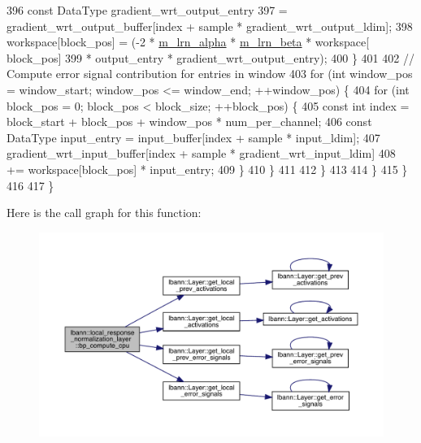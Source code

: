 \begin{DoxyCode}
396             \textcolor{keyword}{const} DataType gradient\_wrt\_output\_entry
397               = gradient\_wrt\_output\_buffer[index + sample * gradient\_wrt\_output\_ldim];
398             workspace[block\_pos] = (-2 * \hyperlink{classlbann_1_1local__response__normalization__layer_a85c25a68888e2e9d163a820326fc09ff}{m\_lrn\_alpha} * \hyperlink{classlbann_1_1local__response__normalization__layer_ad06848e9d59664be86aecbc1e2ba556f}{m\_lrn\_beta} * workspace[
      block\_pos]
399                                     * output\_entry * gradient\_wrt\_output\_entry);
400           \}
401 
402           \textcolor{comment}{// Compute error signal contribution for entries in window}
403           \textcolor{keywordflow}{for} (\textcolor{keywordtype}{int} window\_pos = window\_start; window\_pos <= window\_end; ++window\_pos) \{
404             \textcolor{keywordflow}{for} (\textcolor{keywordtype}{int} block\_pos = 0; block\_pos < block\_size; ++block\_pos) \{
405               \textcolor{keyword}{const} \textcolor{keywordtype}{int} index = block\_start + block\_pos + window\_pos * num\_per\_channel;
406               \textcolor{keyword}{const} DataType input\_entry = input\_buffer[index + sample * input\_ldim];
407               gradient\_wrt\_input\_buffer[index + sample * gradient\_wrt\_input\_ldim]
408                 += workspace[block\_pos] * input\_entry;
409             \}
410           \}
411 
412         \}
413 
414       \}
415     \}
416 
417   \}
\end{DoxyCode}
Here is the call graph for this function\+:\nopagebreak
\begin{figure}[H]
\begin{center}
\leavevmode
\includegraphics[width=350pt]{classlbann_1_1local__response__normalization__layer_a1aac4bf5e2500749bc8bafcd254f5699_cgraph}
\end{center}
\end{figure}
